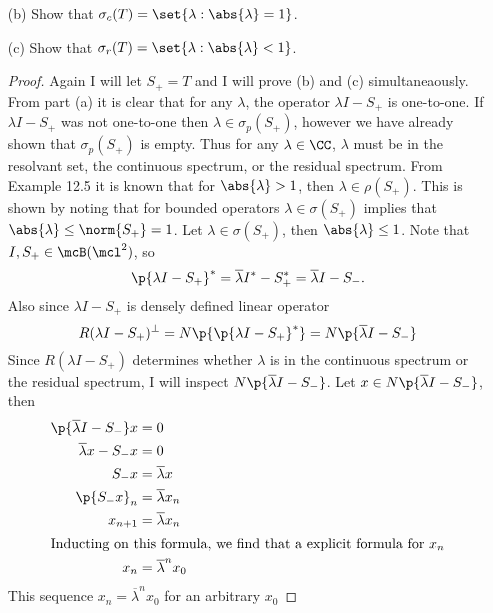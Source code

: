 \documentclass[11pt, oneside]{article}
\begin{document}
\begin{enumerate}
\begin{enumerate}
      \item[(b)] %
        Show that $\sigma_c(T) = \set{\lambda: \abs{\lambda}= 1}$.

      \item[(c)] %
        Show that $\sigma_r(T) = \set{\lambda: \abs{\lambda} < 1}$.

        \begin{proof}
          Again I will let $S_+ = T$ and I will prove (b) and (c) simultaneaously.
          From part (a) it is clear that for any $\lambda$, the operator
          $\lambda I - S_+$ is one-to-one.
          If $\lambda I - S_+$ was not one-to-one then
          $\lambda \in \sigma_p(S_+)$, however we have already shown that
          $\sigma_p(S_+)$ is empty.
          Thus for any $\lambda \in \CC$, $\lambda$ must be in the resolvant
          set, the continuous spectrum, or the residual spectrum.
          From Example 12.5 it is known that for $\abs{\lambda} > 1$, then
          $\lambda \in \rho(S_+)$.
          This is shown by noting that for bounded operators
          $\lambda \in \sigma(S_+)$ implies that
          $\abs{\lambda} \le \norm{S_+} = 1$.
          Let $\lambda \in \sigma(S_+)$, then $\abs{\lambda} \le 1$.
          Note that $I, S_+ \in \mcB(\mcl^2)$, so
          \[
            \p{\lambda I - S_+}^* = \overline{\lambda} I^* - S_+^* = \overline{\lambda} I - S_-.
          \]
          Also since $\lambda I - S_+$ is densely defined linear operator
          \[
            R(\lambda I - S_+)^{\perp} = N\p{\p{\lambda I - S_+}^*} = N\p{\overline{\lambda} I - S_-}
          \]
          Since $R(\lambda I - S_+)$ determines whether $\lambda$ is in the
          continuous spectrum or the residual spectrum, I will inspect
          $N\p{\overline{\lambda} I - S_-}$.
          Let $x \in N\p{\overline{\lambda} I - S_-}$, then
          \begin{align*}
            \p{\overline{\lambda} I - S_-}x &= 0 \\
            \overline{\lambda} x - S_-x &= 0 \\
            S_-x &= \overline{\lambda}x \\
            \p{S_-x}_n &= \overline{\lambda} x_n \\
            x_{n+1} &= \overline{\lambda} x_n \\
            \intertext{Inducting on this formula, we find that a explicit
              formula for $x_n$}
            x_n &= \overline{\lambda}^n x_0
          \end{align*}
          This sequence $x_n = \overline{\lambda}^n x_0$ for an arbitrary $x_0$

\end{proof}
\end{enumerate}
\end{enumerate}
\end{document}
